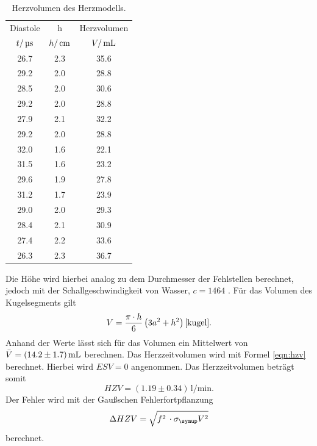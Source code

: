 \begin{table}[H]
  \centering
  \begin{tabular}{ccc}
    \toprule
    \multicolumn{1}{c}{Diastole}&\multicolumn{1}{c}{h}&\multicolumn{1}{c}{Herzvolumen}\\
    $t/\,\si{\micro\second}$ & $h/\,\si{\centi\meter}$ & $V/\,\si{\milli\litre}$ \\
    \midrule
    26.7 & 2.3 & 35.6  \\
    29.2 & 2.0 & 28.8  \\
    28.5 & 2.0 & 30.6  \\
    29.2 & 2.0 & 28.8  \\
    27.9 & 2.1 & 32.2  \\
    29.2 & 2.0 & 28.8  \\
    32.0 & 1.6 & 22.1  \\
    31.5 & 1.6 & 23.2  \\
    29.6 & 1.9 & 27.8  \\
    31.2 & 1.7 & 23.9  \\
    29.0 & 2.0 & 29.3  \\
    28.4 & 2.1 & 30.9  \\
    27.4 & 2.2 & 33.6  \\
    26.3 & 2.3 & 36.7  \\
    \bottomrule
  \end{tabular}
  \caption{Herzvolumen des Herzmodells.}
  \label{tab:dia}
\end{table}
\noindent Die Höhe wird hierbei analog zu dem Durchmesser der Fehlstellen berechnet, jedoch
mit der Schallgeschwindigkeit von Wasser, $c = 1464$ \cite{spektrum}.
Für das Volumen des Kugelsegments gilt
\begin{equation*}
  V=\frac{\pi\cdot h}{6}\left(3a^2+h^2\right)\text{\cite{kugel}}.
\end{equation*}
Anhand der Werte lässt sich für das Volumen ein Mittelwert von $\bar V=(14.2\pm1.7)\,\si{\milli\litre}$
berechnen.
Das Herzzeitvolumen wird mit Formel \eqref{eqn:hzv} berechnet. Hierbei wird
$ESV=0$ angenommen.
Das Herzzeitvolumen beträgt somit
\begin{equation*}
  HZV = (1.19 \pm 0.34)\,\si{\litre\per\minute}.
\end{equation*}
Der Fehler wird mit der Gaußschen Fehlerfortpflanzung
\begin{equation*}
  \Delta HZV = \sqrt{f^2\,\cdot\sigma_\su{V}^2}
\end{equation*}
berechnet.
\newpage
